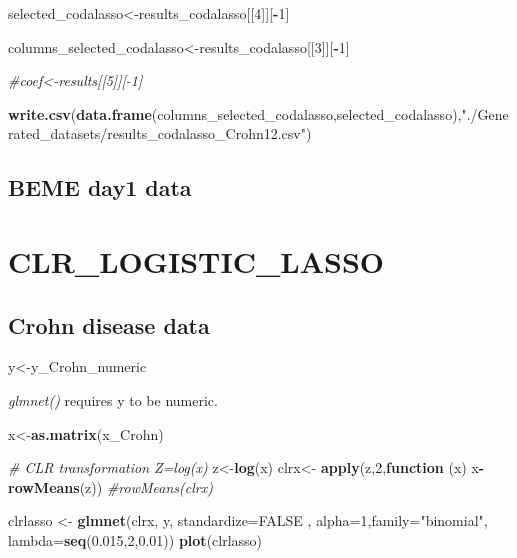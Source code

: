 \documentclass[]{book}
\newenvironment{Shaded}{\begin{snugshade}}{\end{snugshade}}
\newcommand{\KeywordTok}[1]{\textcolor[rgb]{0.13,0.29,0.53}{\textbf{#1}}}
\newcommand{\DataTypeTok}[1]{\textcolor[rgb]{0.13,0.29,0.53}{#1}}
\newcommand{\DecValTok}[1]{\textcolor[rgb]{0.00,0.00,0.81}{#1}}
\newcommand{\FloatTok}[1]{\textcolor[rgb]{0.00,0.00,0.81}{#1}}
\newcommand{\StringTok}[1]{\textcolor[rgb]{0.31,0.60,0.02}{#1}}
\newcommand{\CommentTok}[1]{\textcolor[rgb]{0.56,0.35,0.01}{\textit{#1}}}
\newcommand{\OtherTok}[1]{\textcolor[rgb]{0.56,0.35,0.01}{#1}}
\newcommand{\ControlFlowTok}[1]{\textcolor[rgb]{0.13,0.29,0.53}{\textbf{#1}}}
\newcommand{\OperatorTok}[1]{\textcolor[rgb]{0.81,0.36,0.00}{\textbf{#1}}}
\newcommand{\NormalTok}[1]{#1}
\begin{document}
\begin{Shaded}
\begin{Highlighting}[]
\NormalTok{selected_codalasso<-results_codalasso[[}\DecValTok{4}\NormalTok{]][}\OperatorTok{-}\DecValTok{1}\NormalTok{]}

\NormalTok{columns_selected_codalasso<-results_codalasso[[}\DecValTok{3}\NormalTok{]][}\OperatorTok{-}\DecValTok{1}\NormalTok{]}

\CommentTok{#coef<-results[[5]][-1]}

\KeywordTok{write.csv}\NormalTok{(}\KeywordTok{data.frame}\NormalTok{(columns_selected_codalasso,selected_codalasso),}\StringTok{"./Generated_datasets/results_codalasso_Crohn12.csv"}\NormalTok{)}
\end{Highlighting}
\end{Shaded}

\section{BEME day1 data}\label{beme-day1-data-1}

\chapter{CLR\_LOGISTIC\_LASSO}\label{clr}

\section{Crohn disease data}\label{crohn-disease-data-2}

\begin{Shaded}
\begin{Highlighting}[]
\NormalTok{y<-y_Crohn_numeric }
\end{Highlighting}
\end{Shaded}

\emph{glmnet()} requires y to be numeric.

\begin{Shaded}
\begin{Highlighting}[]
\NormalTok{x<-}\KeywordTok{as.matrix}\NormalTok{(x_Crohn) }

\CommentTok{# CLR transformation Z=log(x)}
\NormalTok{z<-}\KeywordTok{log}\NormalTok{(x)}
\NormalTok{clrx<-}\StringTok{ }\KeywordTok{apply}\NormalTok{(z,}\DecValTok{2}\NormalTok{,}\ControlFlowTok{function}\NormalTok{ (x) x}\OperatorTok{-}\KeywordTok{rowMeans}\NormalTok{(z))}
\CommentTok{#rowMeans(clrx)  }

\NormalTok{clrlasso <-}\StringTok{ }\KeywordTok{glmnet}\NormalTok{(clrx, y, }\DataTypeTok{standardize=}\OtherTok{FALSE}\NormalTok{ , }\DataTypeTok{alpha=}\DecValTok{1}\NormalTok{,}\DataTypeTok{family=}\StringTok{"binomial"}\NormalTok{, }\DataTypeTok{lambda=}\KeywordTok{seq}\NormalTok{(}\FloatTok{0.015}\NormalTok{,}\DecValTok{2}\NormalTok{,}\FloatTok{0.01}\NormalTok{)) }
\KeywordTok{plot}\NormalTok{(clrlasso)}
\end{Highlighting}
\end{Shaded}
\end{document}
